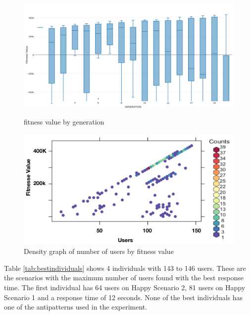 \begin{figure}[h]
\begin{minipage}{.5\textwidth}
\centering
\includegraphics[width=1\textwidth]{./images/experiment1-5.png}
\caption{fitness value by generation}
\label{fig:summaryboxplot1}
\end{minipage}
\begin{minipage}{.5\textwidth}
\centering
\includegraphics[width=1\textwidth]{./images/experiment1-6.png}
\caption{Density graph of number of users by fitness value}
\label{fig:density1}
\end{minipage}
\end{figure}

Table \ref{tab:bestindividuals} shows 4 individuals with 143 to 146 users. These are the scenarios with the maximum number of users found with the best response time. The first individual has 64 users on Happy Scenario 2, 81 users on Happy Scenario 1 and a response time of 12 seconds. None of the best individuals has one of the antipatterns used in the experiment.




